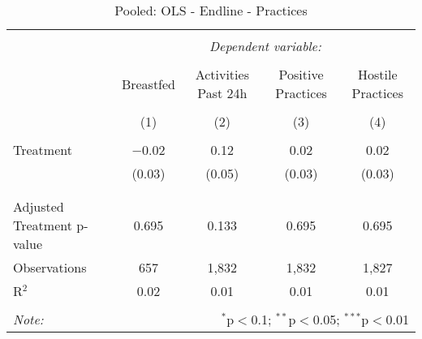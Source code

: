 
\begin{table}[!htbp] \centering 
  \caption{Pooled: OLS - Endline - Practices} 
  \label{tbl:Pooled: OLS - Endline - Practices} 
\begin{tabular}{@{\extracolsep{5pt}}lcccc} 
\\[-1.8ex]\hline 
\hline \\[-1.8ex] 
 & \multicolumn{4}{c}{\textit{Dependent variable:}} \\ 
\cline{2-5} 
\\[-1.8ex] & Breastfed & Activities Past 24h & Positive Practices & Hostile Practices \\ 
\\[-1.8ex] & (1) & (2) & (3) & (4)\\ 
\hline \\[-1.8ex] 
 Treatment & $-$0.02 & 0.12 & 0.02 & 0.02 \\ 
  & (0.03) & (0.05) & (0.03) & (0.03) \\ 
  & & & & \\ 
\hline \\[-1.8ex] 
Adjusted Treatment p-value & 0.695 & 0.133 & 0.695 & 0.695 \\ 
Observations & 657 & 1,832 & 1,832 & 1,827 \\ 
R$^{2}$ & 0.02 & 0.01 & 0.01 & 0.01 \\ 
\hline 
\hline \\[-1.8ex] 
\textit{Note:}  & \multicolumn{4}{r}{$^{*}$p$<$0.1; $^{**}$p$<$0.05; $^{***}$p$<$0.01} \\ 
\end{tabular} 
\end{table} 
